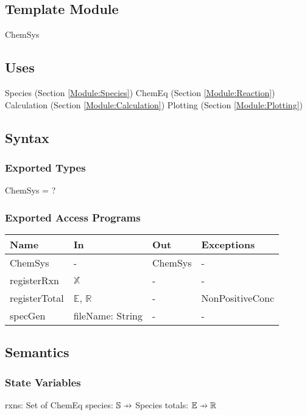 \documentclass[12pt, titlepage]{article}
\newcommand\pfun{\mathrel{\ooalign{\hfil$\mapstochar\mkern5mu$\hfil\cr$\to$\cr}}}
\begin{document}
\subsection{Template Module}

ChemSys

\subsection{Uses}

Species (Section \ref{Module:Species})
\newline ChemEq (Section \ref{Module:Reaction})
\newline Calculation (Section \ref{Module:Calculation})
\newline Plotting (Section \ref{Module:Plotting})

\subsection{Syntax}

\subsubsection{Exported Types}

ChemSys = ?

\subsubsection{Exported Access Programs}

\begin{center}
\begin{tabular}{p{3cm} p{3cm} p{3cm} p{3cm}}
\hline
\textbf{Name} & \textbf{In} & \textbf{Out} & \textbf{Exceptions} \\
\hline
ChemSys & - & ChemSys & - \\
registerRxn & $\mathbb{X}$ & - & - \\
registerTotal & $\mathbb{E}$, $\mathbb{R}$ & - & NonPositiveConc \\ 
specGen & fileName: String & - & - \\
\hline
\end{tabular}
\end{center}

\subsection{Semantics}

\subsubsection{State Variables}
rxns: Set of ChemEq
\newline species: $\mathbb{S} \pfun$ Species
\newline totals: $\mathbb{E} \pfun \mathbb{R}$ 
\end{document}
